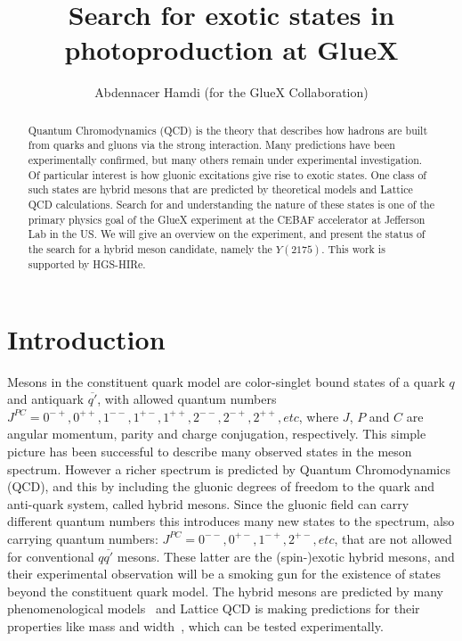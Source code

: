 \documentclass[a4paper]{jpconf}
\begin{document}
\title{Search for exotic states in photoproduction at GlueX}

\author{Abdennacer Hamdi (for the GlueX Collaboration)}

\address{GSI Helmholtzzentrum f\"ur Schwerionenforschung GmbH, Planckstr. 1, 64291 Darmstadt, Germany}


\begin{abstract}
    Quantum Chromodynamics (QCD) is the theory that describes how hadrons are built from quarks and gluons via the strong interaction. Many predictions have been experimentally confirmed, but many others remain under experimental investigation.
    Of particular interest is how gluonic excitations give rise to exotic states. One class of such states are hybrid mesons that are predicted by theoretical models and Lattice QCD calculations.
    Search for and understanding the nature of these states is one of the primary physics goal of the GlueX experiment at the CEBAF accelerator at Jefferson Lab in the US.
    We will give an overview on the experiment, and present the status of the search for a hybrid meson candidate, namely the $Y(2175)$.
    This work is supported by HGS-HIRe.
\end{abstract}

\section{Introduction}
Mesons in the constituent quark model are color-singlet bound states of a quark $q$ and antiquark $\overline{q'}$, with allowed quantum numbers $J^{PC} = 0^{-+}, 0^{++}, 1^{--}, 1^{+-}, 1^{++}, 2^{--}, 2^{-+}, 2^{++}, etc$, where $J$, $P$ and $C$ are angular momentum, parity and charge conjugation, respectively. This simple picture has been successful to describe many observed states in the meson spectrum. However a richer spectrum is predicted by Quantum Chromodynamics (QCD), and this by including the gluonic degrees of freedom to the quark and anti-quark system, called hybrid mesons. Since the gluonic field can carry different quantum numbers this introduces many new states to the spectrum, also carrying quantum numbers: $J^{PC} = 0^{--}, 0^{+-}, 1^{-+}, 2^{+-}, etc$, that are not allowed for conventional $q\overline{q'}$ mesons. These latter are the (spin-)exotic hybrid mesons, and their experimental observation will be a smoking gun for the existence of states beyond the constituent quark model. The hybrid mesons are predicted by many phenomenological models~\cite{ref.1} and Lattice QCD is making predictions for their properties like mass and width~\cite{ref.2}, which can be tested experimentally.
\end{document}
